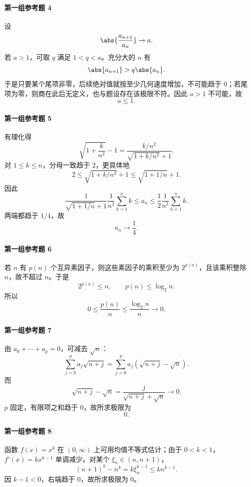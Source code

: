\paragraph{第一组参考题 4}
\begin{xsolution}
设
\[
  \abs{\frac{a_{n+1}}{a_n}}\to a.
\]
若 $a>1$，可取 $q$ 满足 $1<q<a$。充分大的 $n$ 有
\[
  \abs{a_{n+1}}>q\abs{a_n}.
\]
于是只要某个尾项非零，后续绝对值就按至少几何速度增加，不可能趋于 $0$；若尾项为零，则商在此后无定义，也与题设存在该极限不符。因此 $a>1$ 不可能，故
\[
  \boxed{a\le1}.
\]
\end{xsolution}

\paragraph{第一组参考题 5}
\begin{xsolution}
有理化得
\[
  \sqrt{1+\frac{k}{n^2}}-1
  =\frac{k/n^2}{\sqrt{1+k/n^2}+1}.
\]
对 $1\le k\le n$，分母一致趋于 $2$，更具体地
\[
  2\le \sqrt{1+k/n^2}+1\le\sqrt{1+1/n}+1.
\]
因此
\[
  \frac{1}{\sqrt{1+1/n}+1}\frac1{n^2}\sum_{k=1}^n k
  \le a_n
  \le\frac12\frac1{n^2}\sum_{k=1}^n k.
\]
两端都趋于 $1/4$，故
\[
  \boxed{a_n\to\frac14}.
\]
\end{xsolution}

\paragraph{第一组参考题 6}
\begin{xsolution}
若 $n$ 有 $p(n)$ 个互异素因子，则这些素因子的乘积至少为 $2^{p(n)}$，且该乘积整除 $n$，故不超过 $n$。于是
\[
  2^{p(n)}\le n,
  \qquad
  p(n)\le\log_2 n.
\]
所以
\[
  0\le\frac{p(n)}n\le\frac{\log_2 n}{n}\to0.
\]
\end{xsolution}

\paragraph{第一组参考题 7}
\begin{xsolution}
由 $a_0+\cdots+a_p=0$，可减去 $\sqrt n$：
\[
  \sum_{j=0}^p a_j\sqrt{n+j}
  =\sum_{j=0}^p a_j(\sqrt{n+j}-\sqrt n).
\]
而
\[
  \sqrt{n+j}-\sqrt n
  =\frac{j}{\sqrt{n+j}+\sqrt n}\to0.
\]
$p$ 固定，有限项之和趋于 $0$，故所求极限为
\[
  \boxed{0}.
\]
\end{xsolution}

\paragraph{第一组参考题 8}
\begin{xsolution}
函数 $f(x)=x^k$ 在 $(0,\infty)$ 上可用均值不等式估计；由于 $0<k<1$，$f'(x)=kx^{k-1}$ 单调减少。对某个 $\xi_n\in(n,n+1)$，
\[
  (n+1)^k-n^k=k\xi_n^{k-1}\le k n^{k-1}.
\]
因 $k-1<0$，右端趋于 $0$，故所求极限为 $0$。
\end{xsolution}

